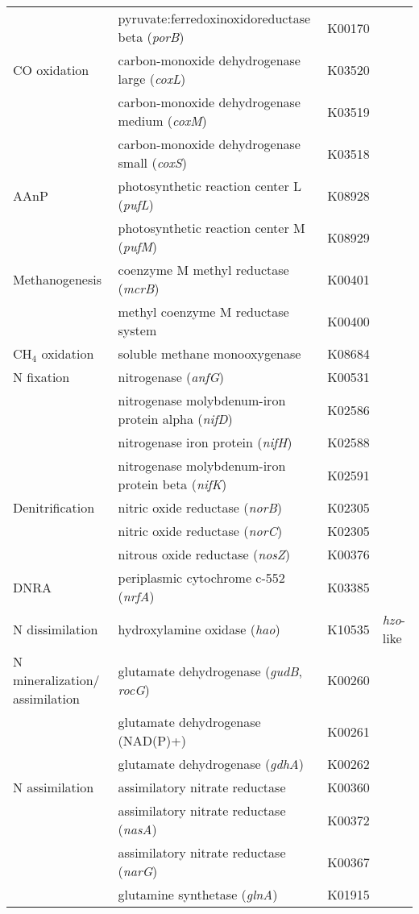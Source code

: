 \begin{longtable}{p{2.7cm}p{7.5cm}p{1cm}p{1.8cm}}
 & pyruvate:ferredoxinoxidoreductase beta (\emph{porB}) & K00170 &  \\
CO oxidation & carbon-monoxide dehydrogenase large (\emph{coxL}) & K03520 &  \\
 & carbon-monoxide dehydrogenase medium (\emph{coxM}) & K03519 &  \\
 & carbon-monoxide dehydrogenase small (\emph{coxS}) & K03518 &  \\
AAnP & photosynthetic reaction center L (\emph{pufL}) & K08928 &  \\
 & photosynthetic reaction center M (\emph{pufM}) & K08929 &  \\
Methanogenesis & coenzyme M methyl reductase (\emph{mcrB}) & K00401 &  \\
 & methyl coenzyme M reductase system & K00400 &  \\
CH$_4$ oxidation & soluble methane monooxygenase & K08684 &  \\
N fixation & nitrogenase (\emph{anfG}) & K00531 &  \\
 & nitrogenase molybdenum-iron protein alpha (\emph{nifD}) & K02586 &  \\
 & nitrogenase iron protein (\emph{nifH}) & K02588 &  \\
 & nitrogenase  molybdenum-iron protein beta (\emph{nifK}) & K02591 &  \\
Denitrification & nitric oxide reductase (\emph{norB}) & K02305 &  \\
 & nitric oxide reductase (\emph{norC}) & K02305 &  \\
 & nitrous oxide reductase (\emph{nosZ}) & K00376 &  \\
DNRA & periplasmic cytochrome c-552 (\emph{nrfA}) & K03385 &  \\
N dissimilation & hydroxylamine oxidase (\emph{hao}) & K10535 & \emph{hzo}-like \\
N mineralization/ assimilation & glutamate dehydrogenase (\emph{gudB}, \emph{rocG}) & K00260 &  \\
 & glutamate dehydrogenase (NAD(P)+) & K00261 &  \\
 & glutamate dehydrogenase (\emph{gdhA}) & K00262 &  \\
N assimilation & assimilatory nitrate reductase & K00360 &  \\
 & assimilatory nitrate reductase (\emph{nasA}) & K00372 &  \\
 & assimilatory nitrate reductase (\emph{narG}) & K00367 &  \\
 & glutamine synthetase (\emph{glnA}) & K01915 &  \\

\end{longtable}
